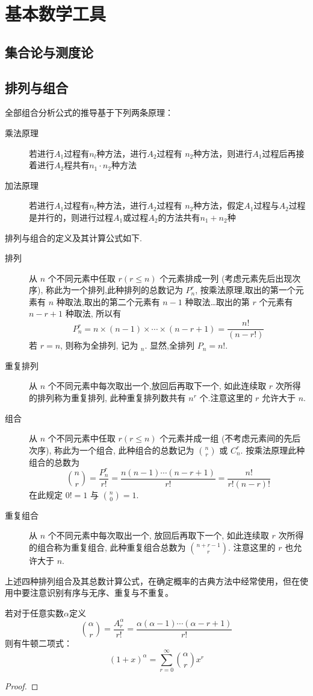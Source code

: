\chapter{基本数学工具}

\section{集合论与测度论}

\section{排列与组合}

全部组合分析公式的推导基于下列两条原理：
\begin{description}
  \item[乘法原理] 若进行$A_1$过程有$n_l$种方法，进行$A_2$过程有 $n_2$种方法，则进行$A_1$过程后再接着进行$A_2$程共有$n_1 \cdot  n_2$种方法
  \item[加法原理] 若进行$A_1$过程有$n_l$种方法，进行$A_2$过程有 $n_2$种方法，假定$A_1$过程与$A_2$过程是并行的，则进行过程$A_1$或过程$A_2$的方法共有$n_1 +n_2$种
\end{description}

排列与组合的定义及其计算公式如下.
\begin{description}
  \item [排列]  从 $n$ 个不同元素中任取 $r (r \le n)$ 个元素排成一列 (考虑元素先后出现次序), 称此为一个排列,此种排列的总数记为 $P_n^r$, 按乘法原理,取出的第一个元素有 $n$ 种取法,取出的第二个元素有 $n - 1$ 种取法\dots 取出的第 $r$ 个元素有 $n - r + 1$ 种取法, 所以有
        \[ P_n^r = n \times (n - 1) \times \dotsb \times (n - r + 1) = \frac{n!}{(n - r!)} \]
        若 $r = n$, 则称为全排列, 记为 $_n$. 显然,全排列 $P_n = n!$.
  \item [重复排列]  从 $n$ 个不同元素中每次取出一个,放回后再取下一个,  如此连续取 $r$ 次所得的排列称为重复排列, 此种重复排列数共有 $n^r$ 个.注意这里的 $r$ 允许大于 $n$.
  \item [组合]   从 $n$ 个不同元素中任取 $r (r \le n)$ 个元素并成一组 (不考虑元素间的先后次序), 称此为一个组合, 此种组合的总数记为 $\binom{n}{r}$ 或 $C_n^r$. 按乘法原理此种组合的总数为
        \[ \binom{n}{r} = \frac{P_n^r}{r!} = \frac{n (n - 1) \dotsb (n - r + 1)}{r!} = \frac{n!}{r! (n - r)!} \]
        在此规定 $0! = 1$ 与 $\binom{n}{0} = 1$.
  \item [重复组合] 从 $n$ 个不同元素中每次取出一个, 放回后再取下一个, 如此连续取 $r$ 次所得的组合称为重复组合, 此种重复组合总数为 $\binom{n + r - 1}{r}$. 注意这里的 $r$ 也允许大于 $n$.
\end{description}

上述四种排列组合及其总数计算公式，在确定概率的古典方法中经常使用，但在使用中要注意识别有序与无序、重复与不重复。

\begin{theorem}[牛顿二项式定理]\label{No}
  若对于任意实数$\alpha$定义
  \[ \binom{\alpha}{r}=\frac{A^{\alpha}_{r}}{r!}=\frac{\alpha(\alpha-1)\cdots (\alpha-r+1)}{r!} \]
  则有牛顿二项式：
  \[ (1+x)^{\alpha}=\sum_{r=0}^{\infty}\binom{\alpha}{r}x^r \]
\end{theorem}

\begin{proof}
\end{proof}
